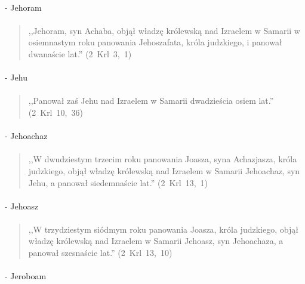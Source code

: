 \documentclass[10pt,a4paper,oneside]{article}
\begin{document}
\paragraph{}
- Jehoram
\paragraph{}
\begin{quote}
,,Jehoram, syn Achaba, objął władzę królewską nad Izraelem w Samarii w osiemnastym roku panowania Jehoszafata, króla judzkiego, i panował dwanaście lat.'' \mbox{(2 Krl 3, 1)}
\end{quote}
\paragraph{}
- Jehu
\paragraph{}
\begin{quote}
,,Panował zaś Jehu nad Izraelem w Samarii dwadzieścia osiem lat.'' \mbox{(2 Krl 10, 36)}
\end{quote}
\paragraph{}
- Jehoachaz
\paragraph{}
\begin{quote}
,,W dwudziestym trzecim roku panowania Joasza, syna Achazjasza, króla judzkiego, objął władzę królewską nad Izraelem w Samarii Jehoachaz, syn Jehu, a panował siedemnaście lat.'' \mbox{(2 Krl 13, 1)}
\end{quote}
\paragraph{}
- Jehoasz
\paragraph{}
\begin{quote}
,,W trzydziestym siódmym roku panowania Joasza, króla judzkiego, objął władzę królewską nad Izraelem w Samarii Jehoasz, syn Jehoachaza, a panował szesnaście lat.'' \mbox{(2 Krl 13, 10)}
\end{quote}
\paragraph{}
- Jeroboam
\end{document}
